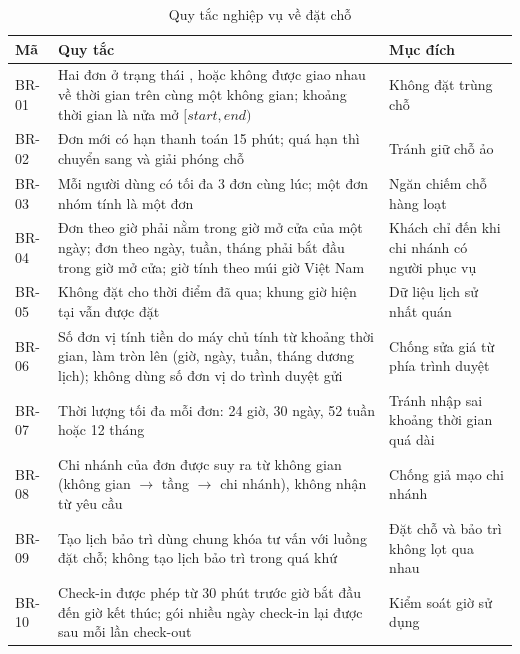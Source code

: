\begin{table}[!htbp]
\centering
\caption{Quy tắc nghiệp vụ về đặt chỗ}
\label{tab:rule_concurrency}
\small
\renewcommand{\arraystretch}{1.2}
\begin{tabularx}{\linewidth}{|P{1.3cm}|L|P{4.6cm}|}
\hline
\textbf{Mã} & \textbf{Quy tắc} & \textbf{Mục đích} \\
\hline
BR-01 & Hai đơn ở trạng thái ,  hoặc  không được giao nhau về thời gian trên cùng một không gian; khoảng thời gian là nửa mở $[start, end)$ & Không đặt trùng chỗ \\
\hline
BR-02 & Đơn mới có hạn thanh toán 15 phút; quá hạn thì chuyển sang  và giải phóng chỗ & Tránh giữ chỗ ảo \\
\hline
BR-03 & Mỗi người dùng có tối đa 3 đơn  cùng lúc; một đơn nhóm tính là một đơn & Ngăn chiếm chỗ hàng loạt \\
\hline
BR-04 & Đơn theo giờ phải nằm trong giờ mở cửa của một ngày; đơn theo ngày, tuần, tháng phải bắt đầu trong giờ mở cửa; giờ tính theo múi giờ Việt Nam & Khách chỉ đến khi chi nhánh có người phục vụ \\
\hline
BR-05 & Không đặt cho thời điểm đã qua; khung giờ hiện tại vẫn được đặt & Dữ liệu lịch sử nhất quán \\
\hline
BR-06 & Số đơn vị tính tiền do máy chủ tính từ khoảng thời gian, làm tròn lên (giờ, ngày, tuần, tháng dương lịch); không dùng số đơn vị do trình duyệt gửi & Chống sửa giá từ phía trình duyệt \\
\hline
BR-07 & Thời lượng tối đa mỗi đơn: 24 giờ, 30 ngày, 52 tuần hoặc 12 tháng & Tránh nhập sai khoảng thời gian quá dài \\
\hline
BR-08 & Chi nhánh của đơn được suy ra từ không gian (không gian $\rightarrow$ tầng $\rightarrow$ chi nhánh), không nhận từ yêu cầu & Chống giả mạo chi nhánh \\
\hline
BR-09 & Tạo lịch bảo trì dùng chung khóa tư vấn với luồng đặt chỗ; không tạo lịch bảo trì trong quá khứ & Đặt chỗ và bảo trì không lọt qua nhau \\
\hline
BR-10 & Check-in được phép từ 30 phút trước giờ bắt đầu đến giờ kết thúc; gói nhiều ngày check-in lại được sau mỗi lần check-out & Kiểm soát giờ sử dụng \\
\hline
\end{tabularx}
\end{table}

